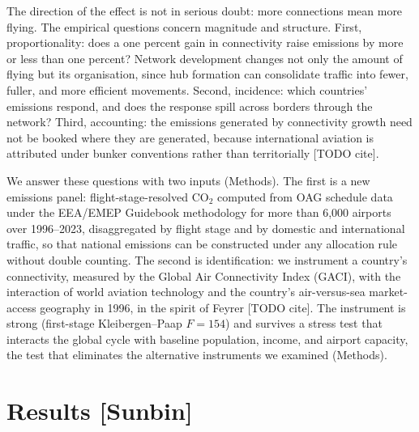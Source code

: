 \documentclass[12pt]{article}
\begin{document}
The direction of the effect is not in serious doubt: more connections mean
more flying. The empirical questions concern magnitude and structure.
First, proportionality: does a one percent gain in connectivity raise
emissions by more or less than one percent? Network development changes not
only the amount of flying but its organisation, since hub formation can
consolidate traffic into fewer, fuller, and more efficient movements.
Second, incidence: which countries' emissions respond, and does the
response spill across borders through the network? Third, accounting: the
emissions generated by connectivity growth need not be booked where they
are generated, because international aviation is attributed under bunker
conventions rather than territorially [TODO cite].

We answer these questions with two inputs (Methods). The first is a new
emissions panel: flight-stage-resolved CO$_2$ computed from OAG schedule
data under the EEA/EMEP Guidebook methodology for more than 6{,}000
airports over 1996--2023, disaggregated by flight stage and by domestic and
international traffic, so that national emissions can be constructed under
any allocation rule without double counting. The second is identification:
we instrument a country's connectivity, measured by the Global Air
Connectivity Index (GACI), with the interaction of world aviation
technology and the country's air-versus-sea market-access geography in
1996, in the spirit of Feyrer [TODO cite]. The instrument is strong
(first-stage Kleibergen--Paap $F = 154$) and survives a stress test that
interacts the global cycle with baseline population, income, and airport
capacity, the test that eliminates the alternative instruments we examined
(Methods).

\section*{Results [Sunbin]}
\end{document}
